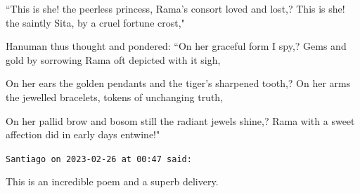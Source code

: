 \begin{footnotesize}
\begin{sffamily}
``This is she! the peerless princess, Rama's consort loved and lost,? This is she! the saintly Sita, by a cruel fortune crost,"

Hanuman thus thought and pondered: ``On her graceful form I spy,? Gems and gold by sorrowing Rama oft depicted with it sigh,

On her ears the golden pendants and the tiger's sharpened tooth,? On her arms the jewelled bracelets, tokens of unchanging truth,

On her pallid brow and bosom still the radiant jewels shine,? Rama with a sweet affection did in early days entwine!"


\hfill

\texttt{Santiago on 2023-02-26 at 00:47 said: }

This is an incredible poem and a superb delivery.


\end{sffamily}\end{footnotesize}
